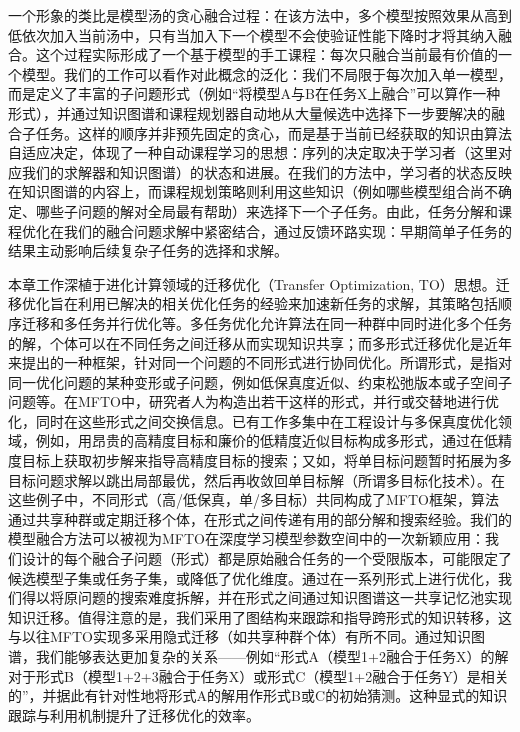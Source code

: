 \documentclass[../main.tex]{subfiles}
\begin{document}
一个形象的类比是模型汤的贪心融合过程：在该方法中，多个模型按照效果从高到低依次加入当前汤中，只有当加入下一个模型不会使验证性能下降时才将其纳入融合。这个过程实际形成了一个基于模型的手工课程：每次只融合当前最有价值的一个模型。我们的工作可以看作对此概念的泛化：我们不局限于每次加入单一模型，而是定义了丰富的子问题形式（例如“将模型A与B在任务X上融合”可以算作一种形式），并通过知识图谱和课程规划器自动地从大量候选中选择下一步要解决的融合子任务。这样的顺序并非预先固定的贪心，而是基于当前已经获取的知识由算法自适应决定，体现了一种自动课程学习的思想：序列的决定取决于学习者（这里对应我们的求解器和知识图谱）的状态和进展。在我们的方法中，学习者的状态反映在知识图谱的内容上，而课程规划策略则利用这些知识（例如哪些模型组合尚不确定、哪些子问题的解对全局最有帮助）来选择下一个子任务。由此，任务分解和课程优化在我们的融合问题求解中紧密结合，通过反馈环路实现：早期简单子任务的结果主动影响后续复杂子任务的选择和求解。

本章工作深植于进化计算领域的迁移优化（Transfer Optimization, TO）思想。迁移优化旨在利用已解决的相关优化任务的经验来加速新任务的求解，其策略包括顺序迁移和多任务并行优化等。多任务优化允许算法在同一种群中同时进化多个任务的解，个体可以在不同任务之间迁移从而实现知识共享；而多形式迁移优化是近年来提出的一种框架，针对同一个问题的不同形式进行协同优化。所谓形式，是指对同一优化问题的某种变形或子问题，例如低保真度近似、约束松弛版本或子空间子问题等。在MFTO中，研究者人为构造出若干这样的形式，并行或交替地进行优化，同时在这些形式之间交换信息。已有工作多集中在工程设计与多保真度优化领域，例如，用昂贵的高精度目标和廉价的低精度近似目标构成多形式，通过在低精度目标上获取初步解来指导高精度目标的搜索；又如，将单目标问题暂时拓展为多目标问题求解以跳出局部最优，然后再收敛回单目标解（所谓多目标化技术）。在这些例子中，不同形式（高/低保真，单/多目标）共同构成了MFTO框架，算法通过共享种群或定期迁移个体，在形式之间传递有用的部分解和搜索经验。我们的模型融合方法可以被视为MFTO在深度学习模型参数空间中的一次新颖应用：我们设计的每个融合子问题（形式）都是原始融合任务的一个受限版本，可能限定了候选模型子集或任务子集，或降低了优化维度。通过在一系列形式上进行优化，我们得以将原问题的搜索难度拆解，并在形式之间通过知识图谱这一共享记忆池实现知识迁移。值得注意的是，我们采用了图结构来跟踪和指导跨形式的知识转移，这与以往MFTO实现多采用隐式迁移（如共享种群个体）有所不同。通过知识图谱，我们能够表达更加复杂的关系——例如“形式A（模型1+2融合于任务X）的解对于形式B（模型1+2+3融合于任务X）或形式C（模型1+2融合于任务Y）是相关的”，并据此有针对性地将形式A的解用作形式B或C的初始猜测。这种显式的知识跟踪与利用机制提升了迁移优化的效率。
\end{document}
